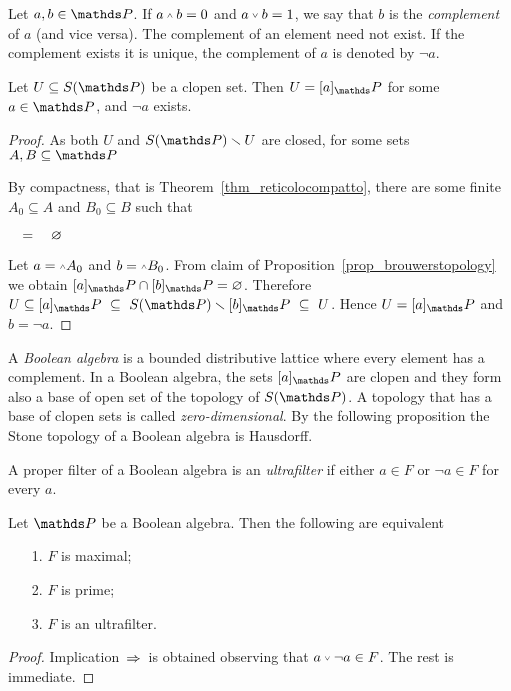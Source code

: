 \documentclass[creche.tex]{subfiles}
\begin{document}
Let $a,b\in\PP$.
If $a\swedge  b=0$ and $a\svee b=1$, we say that $b$ is the \emph{complement\/} of $a$ (and vice versa).
The complement of an element need not exist.
If the complement exists it is unique, the complement of $a$ is denoted by \emph{$\neg a$}.

\begin{lemma}\label{Stone_aperti_chiusi}
Let $U\subseteq S(\PP)$ be a clopen set.
Then $U=[a]_\PP$ for some $a\in\PP$, and $\neg a$ exists.
\end{lemma}

\begin{proof}
As both $U$ and $S(\PP)\sm U$ are closed, for some sets $A, B\subseteq\PP$




By compactness, that is Theorem~\ref{thm_reticolocompatto}, there are some finite $A_0\subseteq A$ and $B_0\subseteq B$ such that

$\quad=\quad\varnothing$

Let $a=\swedge A_0$ and $b=\swedge B_0$.
From claim  of Proposition~\ref{prop_brouwerstopology} we obtain $[a]_\PP\cap[b]_\PP=\0$.
Therefore $U\subseteq [a]_\PP\ \subseteq\ S(\PP)\sm  [b]_\PP\ \subseteq\ U$.
Hence $U= [a]_\PP$ and $b=\neg a$.
\end{proof}

A \emph{Boolean algebra\/} is a bounded distributive lattice where every element has a complement.
In a Boolean algebra, the sets $[a]_\PP$ are clopen and they form also a base of open set of the topology of $S(\PP)$.
A topology that has a base of clopen sets is called \emph{zero-dimensional}.
By the following proposition the Stone topology of a Boolean algebra is Hausdorff.

A proper filter of a Boolean algebra is an \emph{ultrafilter\/} if either $a\in F$ or $\neg a\in F$ for every $a$.

\begin{proposition}
Let $\PP$ be a Boolean algebra.
Then the following are equivalent
\begin{itemize}
\item[1.] $F$ is maximal;
\item[2.] $F$ is prime;
\item[3.] $F$ is an ultrafilter.
\end{itemize}
\end{proposition}
\begin{proof}
Implication \,$\Rightarrow$\, is obtained observing that $a\svee\neg a\in F$.
The rest is immediate.
\end{proof}
\end{document}
